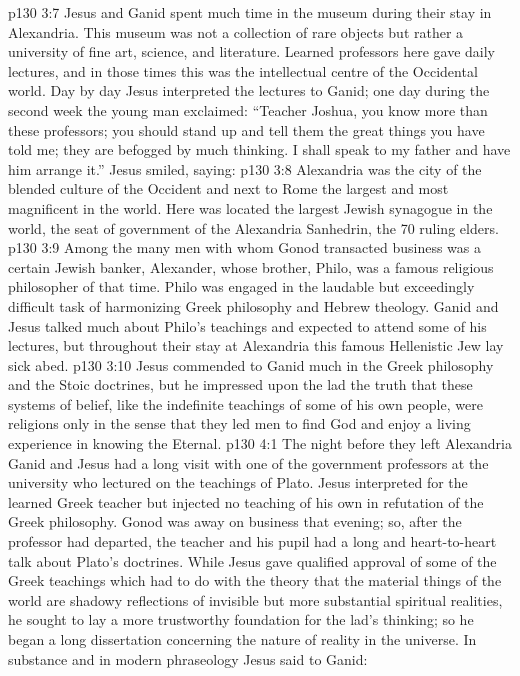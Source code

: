 \vs p130 3:7 \pc Jesus and Ganid spent much time in the museum during their stay in Alexandria. This museum was not a collection of rare objects but rather a university of fine art, science, and literature. Learned professors here gave daily lectures, and in those times this was the intellectual centre of the Occidental world. Day by day Jesus interpreted the lectures to Ganid; one day during the second week the young man exclaimed: “Teacher Joshua, you know more than these professors; you should stand up and tell them the great things you have told me; they are befogged by much thinking. I shall speak to my father and have him arrange it.” Jesus smiled, saying: 
\vs p130 3:8 Alexandria was the city of the blended culture of the Occident and next to Rome the largest and most magnificent in the world. Here was located the largest Jewish synagogue in the world, the seat of government of the Alexandria Sanhedrin, the 70 ruling elders.
\vs p130 3:9 Among the many men with whom Gonod transacted business was a certain Jewish banker, Alexander, whose brother, Philo, was a famous religious philosopher of that time. Philo was engaged in the laudable but exceedingly difficult task of harmonizing Greek philosophy and Hebrew theology. Ganid and Jesus talked much about Philo’s teachings and expected to attend some of his lectures, but throughout their stay at Alexandria this famous Hellenistic Jew lay sick abed.
\vs p130 3:10 Jesus commended to Ganid much in the Greek philosophy and the Stoic doctrines, but he impressed upon the lad the truth that these systems of belief, like the indefinite teachings of some of his own people, were religions only in the sense that they led men to find God and enjoy a living experience in knowing the Eternal.
\vs p130 4:1 The night before they left Alexandria Ganid and Jesus had a long visit with one of the government professors at the university who lectured on the teachings of Plato. Jesus interpreted for the learned Greek teacher but injected no teaching of his own in refutation of the Greek philosophy. Gonod was away on business that evening; so, after the professor had departed, the teacher and his pupil had a long and heart\hyp{}to\hyp{}heart talk about Plato’s doctrines. While Jesus gave qualified approval of some of the Greek teachings which had to do with the theory that the material things of the world are shadowy reflections of invisible but more substantial spiritual realities, he sought to lay a more trustworthy foundation for the lad’s thinking; so he began a long dissertation concerning the nature of reality in the universe. In substance and in modern phraseology Jesus said to Ganid:
